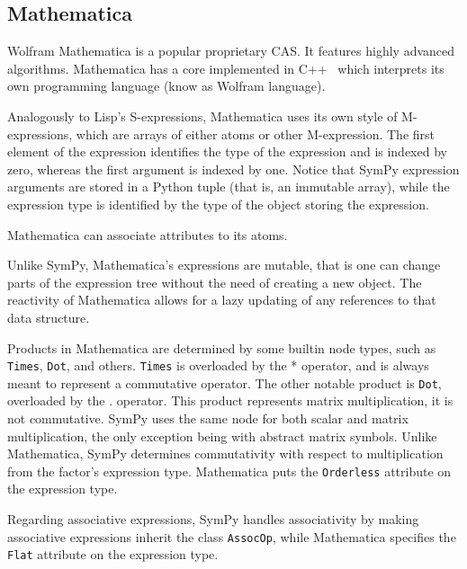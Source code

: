 
\subsection{Mathematica}

Wolfram Mathematica is a popular proprietary CAS.
It features highly advanced algorithms.
Mathematica has a core implemented in C++~\cite{Wolfram2016}
which interprets its own programming language (know as Wolfram language).


Analogously to Lisp's S-expressions,
Mathematica uses its own style of M-expressions,
which are arrays of either atoms or other M-expression.
The first element of the expression identifies the type of the expression
and is indexed by zero, whereas the first argument is indexed by one.
Notice that SymPy expression arguments are stored in a Python tuple
(that is, an immutable array),
while the expression type is identified by the type of the object storing the
expression.


Mathematica can associate attributes to its atoms.


Unlike SymPy, Mathematica's expressions are mutable,
that is one can change parts of the expression tree without the need of
creating a new object.
The reactivity of Mathematica allows for a lazy updating of any references
to that data structure.


Products in Mathematica are determined by some builtin node types,
such as \texttt{Times}, \texttt{Dot}, and others.
\texttt{Times} is overloaded by the * operator,
and is always meant to represent a commutative operator.
The other notable product is \texttt{Dot}, overloaded by the . operator.
This product represents matrix multiplication,
it is not commutative.
SymPy uses the same node for both scalar and matrix multiplication,
the only exception being with abstract matrix symbols.
Unlike Mathematica, SymPy determines commutativity with respect to
multiplication from the factor's expression type.
Mathematica puts the \texttt{Orderless} attribute on the expression
type.


Regarding associative expressions,
SymPy handles associativity by making associative expressions inherit the
class \texttt{AssocOp},
while Mathematica specifies the \texttt{Flat} attribute on the expression type.





